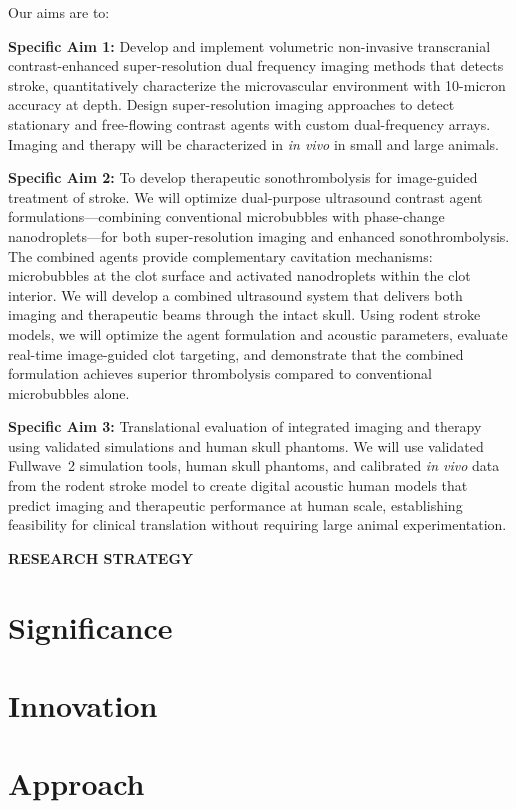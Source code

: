 \documentclass[fleqn,11pt,letterpaper]{article}
\renewcommand{\refname}{\hspace{80mm} \large REFERENCES}
\begin{document}
Our aims are to:

\textbf{Specific Aim 1:} Develop and implement volumetric non-invasive transcranial contrast-enhanced super-resolution dual frequency imaging methods that detects stroke, quantitatively characterize the microvascular environment with 10-micron accuracy at depth. Design super-resolution imaging approaches to detect stationary and free-flowing contrast agents with custom dual-frequency arrays. Imaging and therapy will be characterized in \textit{in vivo} in small and large animals.

\textbf{Specific Aim 2:}
To develop therapeutic sonothrombolysis for image-guided treatment of stroke. We will optimize dual-purpose ultrasound contrast agent formulations---combining conventional microbubbles with phase-change nanodroplets---for both super-resolution imaging and enhanced sonothrombolysis. The combined agents provide complementary cavitation mechanisms: microbubbles at the clot surface and activated nanodroplets within the clot interior. We will develop a combined ultrasound system that delivers both imaging and therapeutic beams through the intact skull. Using rodent stroke models, we will optimize the agent formulation and acoustic parameters, evaluate real-time image-guided clot targeting, and demonstrate that the combined formulation achieves superior thrombolysis compared to conventional microbubbles alone.


\textbf{Specific Aim 3:} Translational evaluation of integrated imaging and therapy using validated simulations and human skull phantoms. We will use validated Fullwave~2 simulation tools, human skull phantoms, and calibrated \textit{in vivo} data from the rodent stroke model to create digital acoustic human models that predict imaging and therapeutic performance at human scale, establishing feasibility for clinical translation without requiring large animal experimentation.


\pagebreak 






\pagebreak

\newpage
\begin{center}
\textbf{RESEARCH STRATEGY}
\end{center}
\vspace{-3mm}
\section{Significance}

\section{Innovation}

\section{Approach}




\pagebreak
%


\renewcommand{\refname}{}
\end{document}
